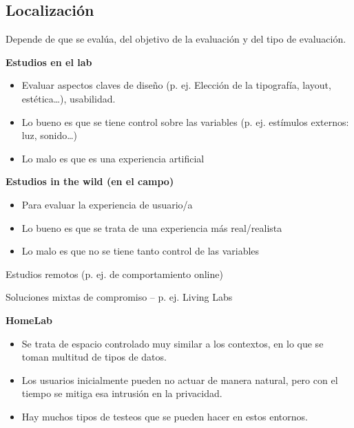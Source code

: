 \documentclass[12pt, twoside, openright]{report} %
\begin{document}
\subsection{Localización}
Depende de que se evalúa, del objetivo de la evaluación y del tipo de evaluación.

\textbf{Estudios en el lab}
\begin{itemize}
	\item Evaluar aspectos claves de diseño (p. ej. Elección de la tipografía, layout, estética…),
	      usabilidad.
	\item Lo bueno es que se tiene control sobre las variables (p. ej. estímulos externos: luz, sonido…)
	\item Lo malo es que es una experiencia artificial
\end{itemize}

\textbf{Estudios in the wild (en el campo)}
\begin{itemize}
	\item Para evaluar la experiencia de usuario/a
	\item Lo bueno es que se trata de una experiencia más real/realista
	\item Lo malo es que no se tiene tanto control de las variables
\end{itemize}

Estudios remotos (p. ej. de comportamiento online)

Soluciones mixtas de compromiso – p. ej. Living Labs

\textbf{HomeLab}
\begin{itemize}
	\item Se trata de espacio controlado muy similar a los contextos, en lo que se toman multitud de tipos de datos.
	\item Los usuarios inicialmente pueden no actuar de manera natural, pero con el tiempo se mitiga esa intrusión en la privacidad.
	\item Hay muchos tipos de testeos que se pueden hacer en estos entornos.
\end{itemize}
\end{document}
